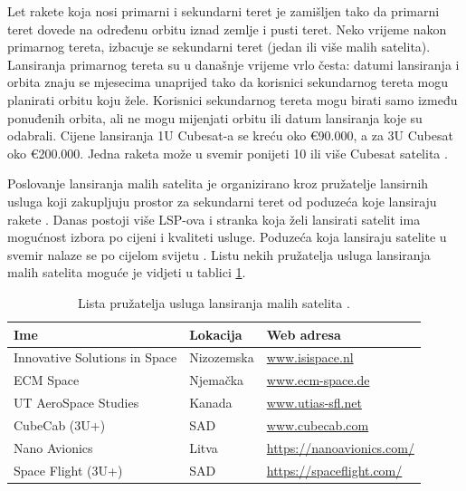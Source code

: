 \documentclass[times, utf8, diplomski, numeric]{templates/template}
\begin{document}
{{            Let rakete koja nosi primarni i sekundarni teret je zamišljen tako da primarni teret dovede na određenu orbitu iznad zemlje i pusti teret. Neko vrijeme nakon primarnog tereta, izbacuje se sekundarni teret (jedan ili više malih satelita). Lansiranja primarnog tereta su u današnje vrijeme vrlo česta: datumi lansiranja i orbita znaju se mjesecima unaprijed tako da korisnici sekundarnog tereta mogu planirati orbitu koju žele. Korisnici sekundarnog tereta mogu birati samo između ponuđenih orbita, ali ne mogu mijenjati orbitu ili datum lansiranja koje su odabrali. Cijene lansiranja 1U Cubesat-a se kreću oko €90.000, a za 3U Cubesat oko €200.000. Jedna raketa može u svemir ponijeti 10 ili više Cubesat satelita \cite{fersat}. 

            Poslovanje lansiranja malih satelita je organizirano kroz pružatelje lansirnih usluga  koji zakupljuju prostor za sekundarni teret od poduzeća koje lansiraju rakete . Danas postoji više LSP-ova i stranka koja želi lansirati satelit ima mogućnost izbora po cijeni i kvaliteti usluge. Poduzeća koja lansiraju satelite u svemir nalaze se po cijelom svijetu \cite{fersat}. Listu nekih pružatelja usluga lansiranja malih satelita moguće je vidjeti u tablici \ref{tbl:pru_lan_uslu}.

            \begin{table}[htb]
            \caption{Lista pružatelja usluga lansiranja malih satelita \cite{fersat}.}
            \label{tbl:pru_lan_uslu}
            \centering
            \begin{tabular}{lll} 
            \toprule
            Ime & Lokacija & Web adresa \\ 
            \midrule
            Innovative Solutions in Space & Nizozemska & \url{www.isispace.nl} \\
            ECM Space & Njemačka & \url{www.ecm-space.de} \\
            UT AeroSpace Studies & Kanada & \url{www.utias-sfl.net} \\
            CubeCab (3U+) & SAD & \url{www.cubecab.com} \\
            Nano Avionics & Litva & \url{https://nanoavionics.com/} \\
            Space Flight (3U+) & SAD & \url{https://spaceflight.com/} \\
            \bottomrule
            \end{tabular}
            \end{table}

}}
\end{document}

